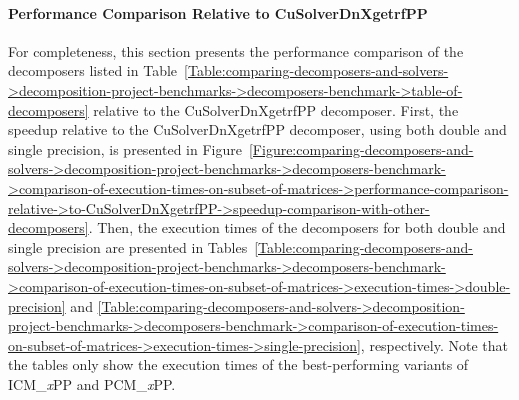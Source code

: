\paragraph{Performance Comparison Relative to CuSolverDnXgetrfPP}\label{Paragraph:comparing-decomposers-and-solvers->decomposition-project-benchmarks->decomposers-benchmark->comparison-of-execution-times-on-subset-of-matrices->performance-comparison-relative->to-CuSolverDnXgetrfPP} For completeness, this section presents the performance comparison of the decomposers listed in Table~\ref{Table:comparing-decomposers-and-solvers->decomposition-project-benchmarks->decomposers-benchmark->table-of-decomposers} relative to the CuSolverDnXgetrfPP decomposer. First, the speedup relative to the CuSolverDnXgetrfPP decomposer, using both double and single precision, is presented in Figure~\ref{Figure:comparing-decomposers-and-solvers->decomposition-project-benchmarks->decomposers-benchmark->comparison-of-execution-times-on-subset-of-matrices->performance-comparison-relative->to-CuSolverDnXgetrfPP->speedup-comparison-with-other-decomposers}. Then, the execution times of the decomposers for both double and single precision are presented in Tables~\ref{Table:comparing-decomposers-and-solvers->decomposition-project-benchmarks->decomposers-benchmark->comparison-of-execution-times-on-subset-of-matrices->execution-times->double-precision} and \ref{Table:comparing-decomposers-and-solvers->decomposition-project-benchmarks->decomposers-benchmark->comparison-of-execution-times-on-subset-of-matrices->execution-times->single-precision}, respectively. Note that the tables only show the execution times of the best-performing variants of ICM\_\textit{x}PP and PCM\_\textit{x}PP.

